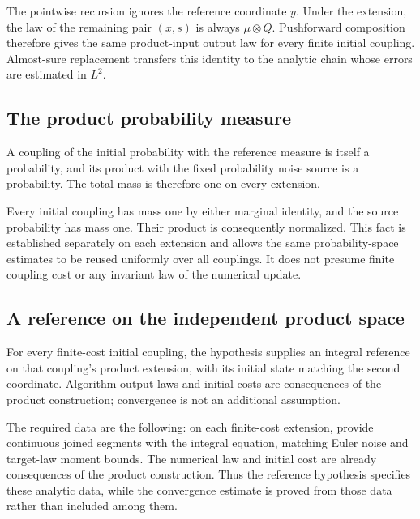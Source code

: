 \documentclass[11pt,a4paper]{article}
\begin{document}
The pointwise recursion ignores the reference coordinate \(y\). Under the extension, the law of the remaining pair \((x,s)\) is always \(\mu\otimes Q\). Pushforward composition therefore gives the same product-input output law for every finite initial coupling. Almost-sure replacement transfers this identity to the analytic chain whose errors are estimated in \(L^2\).


\subsection{\texorpdfstring{The product probability measure}{The product probability measure}}


A coupling of the initial probability with the reference measure is itself a probability, and its product with the fixed probability noise source is a probability. The total mass is therefore one on every extension.



Every initial coupling has mass one by either marginal identity, and the source probability has mass one. Their product is consequently normalized. This fact is established separately on each extension and allows the same probability-space estimates to be reused uniformly over all couplings. It does not presume finite coupling cost or any invariant law of the numerical update.


\subsection{\texorpdfstring{A reference on the independent product space}{A reference on the independent product space}}


For every finite-cost initial coupling, the hypothesis supplies an integral reference on that coupling's product extension, with its initial state matching the second coordinate. Algorithm output laws and initial costs are consequences of the product construction; convergence is not an additional assumption.



The required data are the following: on each finite-cost extension, provide continuous joined segments with the integral equation, matching Euler noise and target-law moment bounds. The numerical law and initial cost are already consequences of the product construction. Thus the reference hypothesis specifies these analytic data, while the convergence estimate is proved from those data rather than included among them.
\end{document}

